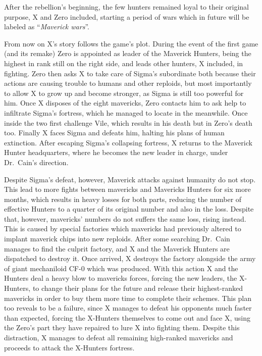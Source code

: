 After the rebellion's beginning, the few hunters remained loyal to their original purpose, X and Zero included, starting a period of wars which in future will be labeled as ``\emph{Maverick wars}''. 

From now on X's story follows the game's plot. During the event of the first game (and its remake) Zero is appointed as leader of the Maverick Hunters, being the highest in rank still on the right side, and leads other hunters, X included, in fighting. Zero then asks  X to take care of Sigma's subordinate both because their actions are causing trouble to humans and other reploids, but most importantly to allow X to grow up and become stronger, as Sigma is still too powerful for him. Once X disposes of the eight mavericks, Zero contacts him to ask help to infiltrate Sigma's fortress, which he managed to locate in the meanwhile. Once inside the two first challenge Vile, which results in his death but in Zero's death too. Finally X faces Sigma and defeats him, halting his plans of human extinction. After escaping Sigma's collapsing fortress, X returns to the Maverick Hunter headquarters, where he becomes the new leader in charge, under Dr.~Cain's direction.

Despite Sigma's defeat, however, Maverick attacks against humanity do not stop. This lead to more fights between mavericks and Mavericks Hunters for six more months, which results in heavy losses for both parts, reducing the number of effective Hunters to a quarter of its original number and also in the loss. Despite that, however, mavericks' numbers do not suffers the same loss, rising instead. This is caused by special factories which mavericks had previously altered to implant maverick chips into new reploids. After some searching Dr.~Cain manages to find the culprit factory, and X and the Maverick Hunters are dispatched to destroy it. Once arrived, X destroys the factory alongside the army of giant mechaniloid CF-0 which was produced. With this action X and the Hunters deal a heavy blow to mavericks forces, forcing the new leaders, the X-Hunters, to change their plans for the future and release their highest-ranked mavericks in order to buy them more time to complete their schemes. This plan too reveals to be a failure, since X manages to defeat his opponents much faster than expected, forcing the X-Hunters themselves to come out and face X, using the Zero's part they have repaired to lure X into fighting them. Despite this distraction, X manages to defeat all remaining high-ranked mavericks and proceeds to attack the X-Hunters fortress. 

